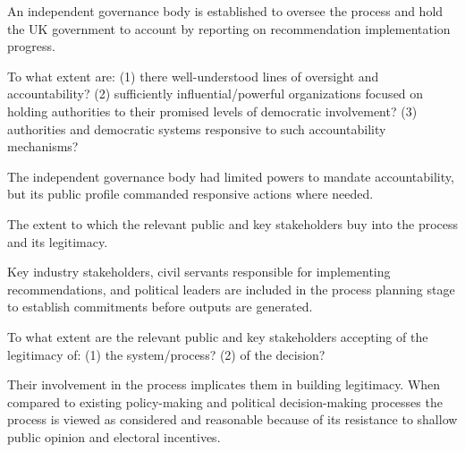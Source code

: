     An independent governance body is established to oversee the process and hold the UK government to account by reporting on recommendation implementation progress.
    
    \begin{evaluate}[grey]
        To what extent are: (1) there well-understood lines of oversight and accountability? (2) sufficiently influential/powerful organizations focused on holding authorities to their promised levels of democratic involvement? (3) authorities and democratic systems responsive to such accountability mechanisms?
    \end{evaluate}

    The independent governance body had limited powers to mandate accountability, but its public profile commanded responsive actions where needed.

    
    \begin{describe}[grey]
        The extent to which the relevant public and key stakeholders buy into the process and its legitimacy.
    \end{describe}

    Key industry stakeholders, civil servants responsible for implementing recommendations, and political leaders are included in the process planning stage to establish commitments before outputs are generated.
    
    \begin{evaluate}[grey]
        To what extent are the relevant public and key stakeholders accepting of the legitimacy of: (1) the system/process? (2) of the decision?
    \end{evaluate}

    Their involvement in the process implicates them in building legitimacy. When compared to existing policy-making and political decision-making processes the process is viewed as considered and reasonable because of its resistance to shallow public opinion and electoral incentives.
